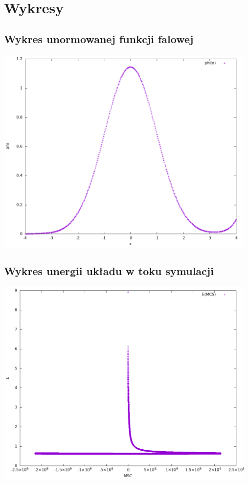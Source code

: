 \documentclass{article}
\begin{document}
\newpage
\section{Wykresy}
\subsection{Wykres unormowanej funkcji falowej}
\includegraphics[width=13cm]{phi.png}

\subsection{Wykres unergii układu w toku symulacji}
\includegraphics[width=13cm]{energy.png}
\end{document}
